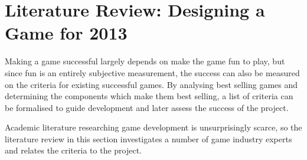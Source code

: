 
\section{Literature Review: Designing a Game for 2013}
\label{sec:litRevDesigningGame}

Making a game successful largely depends on make the game fun to play, but since fun is an entirely subjective measurement, the success can also be measured on the criteria for existing successful games. By analysing best selling games and determining the components which make them best selling, a list of criteria can be formalised to guide development and later assess the success of the project.

Academic literature researching game development is unsurprisingly scarce, so the literature review in this section investigates a number of game industry experts and relates the criteria to the project.


